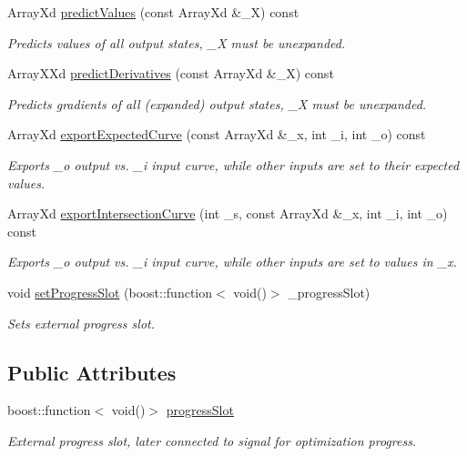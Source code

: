 \begin{DoxyCompactItemize}
Array\-Xd \hyperlink{class_go_s_u_m_1_1_c_analytical_model_abe4cda89f75cca0b3f9f16447a046b3e}{predict\-Values} (const Array\-Xd \&\-\_\-\-X) const 
\begin{DoxyCompactList}\small\item\em Predicts values of all output states, \-\_\-\-X must be unexpanded. \end{DoxyCompactList}\item 
Array\-X\-Xd \hyperlink{class_go_s_u_m_1_1_c_analytical_model_a45f96156ca784a8b8cd9281d8cb84320}{predict\-Derivatives} (const Array\-Xd \&\-\_\-\-X) const 
\begin{DoxyCompactList}\small\item\em Predicts gradients of all (expanded) output states, \-\_\-\-X must be unexpanded. \end{DoxyCompactList}\item 
Array\-Xd \hyperlink{class_go_s_u_m_1_1_c_analytical_model_a480b173f4ea83f1fb132c379a1d0947d}{export\-Expected\-Curve} (const Array\-Xd \&\-\_\-x, int \-\_\-i, int \-\_\-o) const 
\begin{DoxyCompactList}\small\item\em Exports \-\_\-o output vs. \-\_\-i input curve, while other inputs are set to their expected values. \end{DoxyCompactList}\item 
Array\-Xd \hyperlink{class_go_s_u_m_1_1_c_analytical_model_a1b3f0ceefc23e944989e5d26ad63fdad}{export\-Intersection\-Curve} (int \-\_\-s, const Array\-Xd \&\-\_\-x, int \-\_\-i, int \-\_\-o) const 
\begin{DoxyCompactList}\small\item\em Exports \-\_\-o output vs. \-\_\-i input curve, while other inputs are set to values in \-\_\-x. \end{DoxyCompactList}\item 
void \hyperlink{class_go_s_u_m_1_1_c_analytical_model_a614389edb49c62340ee78aeea8732cc1}{set\-Progress\-Slot} (boost\-::function$<$ void()$>$ \-\_\-progress\-Slot)
\begin{DoxyCompactList}\small\item\em Sets external progress slot. \end{DoxyCompactList}\end{DoxyCompactItemize}
\subsection*{Public Attributes}
\begin{DoxyCompactItemize}
\item 
boost\-::function$<$ void()$>$ \hyperlink{class_go_s_u_m_1_1_c_analytical_model_a1a7e0234d76dda2a15b99c95b6b81d4f}{progress\-Slot}
\begin{DoxyCompactList}\small\item\em External progress slot, later connected to signal for optimization progress. \end{DoxyCompactList}\end{DoxyCompactItemize}
